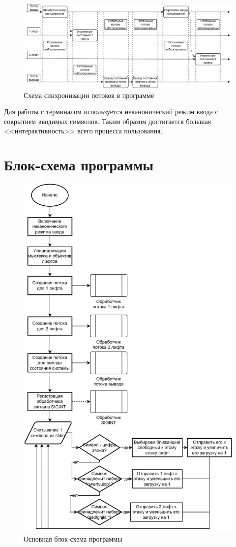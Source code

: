 \begin{figure}[H]
    \centering
    \includegraphics[width=\linewidth]{images/lab2_sync.drawio.png}
    \caption{Схема синхронизации потоков в программе}
    \label{fig:signals}
\end{figure}

Для работы с терминалом используется неканонический режим ввода с сокрытием
вводимых символов. Таким образом достигается большая <<интерактивность>> всего
процесса пользования.

\newpage

\section*{Блок-схема программы}

\begin{figure}[H]
    \centering
    \includegraphics[width=0.75\linewidth]{images/lab2_block_scheme.drawio.png}
    \caption{Основная блок-схема программы}
    \label{fig:flowchart}
\end{figure}

